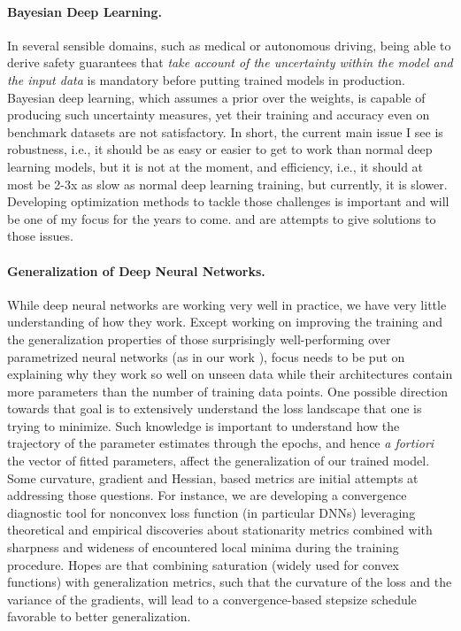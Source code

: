 \documentclass[twoside,11pt]{article}
\begin{document}
\paragraph{Bayesian Deep Learning.} 
In several sensible domains, such as medical or autonomous driving, being able to derive safety guarantees that \emph{take account of the uncertainty within the model and the input data} is mandatory before putting trained models in production.
Bayesian deep learning, which assumes a prior over the weights, is capable of producing such uncertainty measures, yet their training and accuracy even on benchmark datasets are not satisfactory.
In short, the current main issue I see is robustness, i.e., it should be as easy or easier to get to work than normal deep learning models, but it is not at the moment, and efficiency, i.e., it should at most be 2-3x as slow as normal deep learning training, but currently, it is slower.
Developing optimization methods to tackle those challenges is important and will be one of my focus for the years to come.
\citep{karimi2020hwa} and \citep{karimi2020misso} are attempts to give solutions to those issues.


\vspace{0.08in}
\paragraph{Generalization of Deep Neural Networks.} 
While deep neural networks are working very well in practice, we have very little understanding of how they work. 
Except working on improving the training and the generalization properties of those surprisingly well-performing over parametrized neural networks (as in our work  \citep{zhou2020towards}), focus needs to be put on explaining why they work so well on unseen data while their architectures contain more parameters than the number of training data points. 
One possible direction towards that goal is to extensively understand the loss landscape that one is trying to minimize.
Such knowledge is important to understand how the trajectory of the parameter estimates through the epochs, and hence \emph{a fortiori} the vector of fitted parameters, affect the generalization of our trained model.
Some curvature, gradient and Hessian, based metrics are initial attempts at addressing those questions.
For instance, we are developing a convergence diagnostic tool for nonconvex loss function (in particular DNNs) leveraging theoretical and empirical discoveries about stationarity metrics combined with sharpness and wideness of encountered local minima during the training procedure.
Hopes are that combining saturation (widely used for convex functions) with generalization metrics, such that the curvature of the loss and the variance of the gradients, will lead to a convergence-based stepsize schedule favorable to better generalization.
\end{document}
